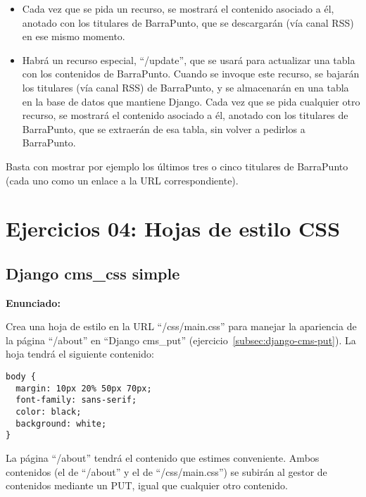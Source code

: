 \begin{itemize}
\item Cada vez que se pida un recurso, se mostrará el contenido asociado a él, anotado con los titulares de BarraPunto, que se descargarán (vía canal RSS) en ese mismo momento.
\item Habrá un recurso especial, ``/update'', que se usará para actualizar una tabla con los contenidos de BarraPunto. Cuando se invoque este recurso, se bajarán los titulares (vía canal RSS) de BarraPunto, y se almacenarán en una tabla en la base de datos que mantiene Django. Cada vez que se pida cualquier otro recurso, se mostrará el contenido asociado a él, anotado con los titulares de BarraPunto, que se extraerán de esa tabla, sin volver a pedirlos a BarraPunto.
\end{itemize}

Basta con mostrar por ejemplo los últimos tres o cinco titulares de BarraPunto (cada uno como un enlace a la URL correspondiente).

\section{Ejercicios 04: Hojas de estilo CSS}

\subsection{Django cms\_css simple}
\label{subsec:django-cms-css}

\textbf{Enunciado:}

Crea una hoja de estilo en la URL ``/css/main.css'' para manejar la apariencia de la página ``/about'' en ``Django cms\_put'' (ejercicio~\ref{subsec:django-cms-put}). La hoja tendrá el siguiente contenido:

\begin{verbatim}
body {
  margin: 10px 20% 50px 70px;
  font-family: sans-serif;
  color: black;
  background: white;
}
\end{verbatim}

La página ``/about'' tendrá el contenido que estimes conveniente. Ambos contenidos (el de ``/about'' y el de ``/css/main.css'') se subirán al gestor de contenidos mediante un PUT, igual que cualquier otro contenido.

